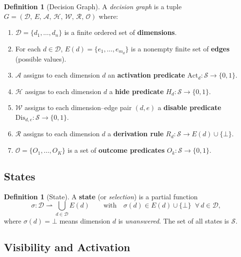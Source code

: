 \documentclass[11pt]{article}
\theoremstyle{definition}
\newtheorem{definition}[theorem]{Definition}
\newcommand{\St}{\mathcal{S}}          %
\newcommand{\Dim}{\mathcal{D}}         %
\newcommand{\Edg}[1]{E(#1)}            %
\newcommand{\sel}{\sigma}              %
\newcommand{\Act}{\mathrm{Act}}        %
\newcommand{\Dis}{\mathrm{Dis}}        %
\begin{document}
\begin{definition}[Decision Graph]\label{def:graph}
A \emph{decision graph} is a tuple
$G = (\Dim,\, E,\, \mathcal{A},\, \mathcal{H},\, \mathcal{W},\,
      \mathcal{R},\, \mathcal{O})$
where:
\begin{enumerate}[label=(\roman*)]
  \item $\Dim = \{d_1,\dots,d_n\}$ is a finite ordered set of
        \textbf{dimensions}.
  \item For each $d \in \Dim$, $\Edg{d} = \{e_1,\dots,e_{m_d}\}$ is a
        nonempty finite set of \textbf{edges} (possible values).
  \item $\mathcal{A}$ assigns to each dimension $d$ an
        \textbf{activation predicate}
        $\Act_d : \St \to \{0,1\}$.
  \item $\mathcal{H}$ assigns to each dimension $d$ a
        \textbf{hide predicate} $H_d : \St \to \{0,1\}$.
  \item $\mathcal{W}$ assigns to each dimension--edge pair $(d,e)$ a
        \textbf{disable predicate}
        $\Dis_{d,e} : \St \to \{0,1\}$.
  \item $\mathcal{R}$ assigns to each dimension $d$ a
        \textbf{derivation rule}
        $R_d : \St \to \Edg{d} \cup \{\bot\}$.
  \item $\mathcal{O} = \{O_1,\dots,O_K\}$ is a set of
        \textbf{outcome predicates} $O_k : \St \to \{0,1\}$.
\end{enumerate}
\end{definition}

\subsection{States}

\begin{definition}[State]\label{def:state}
A \textbf{state} (or \emph{selection}) is a partial function
\[
  \sel : \Dim \rightharpoonup \textstyle\bigcup_{d\in\Dim} \Edg{d}
  \qquad\text{with}\quad
  \sel(d) \in \Edg{d} \cup \{\bot\}
  \;\;\forall\, d \in \Dim,
\]
where $\sel(d) = \bot$ means dimension $d$ is \emph{unanswered}.
The set of all states is $\St$.
\end{definition}

\subsection{Visibility and Activation}
\end{document}
